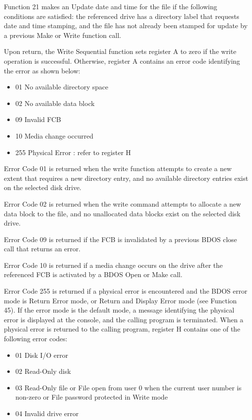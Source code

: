 Function 21 makes an Update date and time for the file if the
following conditions are satisfied: the referenced drive has a
directory label that requests date and time stamping, and the file has
not already been stamped for update by a previous Make or Write
function call.

Upon return, the Write Sequential function sets register A to zero if
the write operation is successful. Otherwise, register A contains an
error code identifying the error as shown below:

\begin{itemize}
\item 01 No available directory space
\item 02 No available data block
\item 09 Invalid FCB
\item 10 Media change occurred
\item 255 Physical Error : refer to register H
\end{itemize}

Error Code 01 is returned when the write function attempts to create a
new extent that requires a new directory entry, and no available
directory entries exist on the selected disk drive.

Error Code 02 is returned when the write command attempts to allocate
a new data block to the file, and no unallocated data blocks exist on
the selected disk drive.

Error Code 09 is returned if the FCB is invalidated by a previous BDOS
close call that returns an error.

Error Code 10 is returned if a media change occurs on the drive after
the referenced FCB is activated by a BDOS Open or Make call.

Error Code 255 is returned if a physical error is encountered and the
BDOS error mode is Return Error mode, or Return and Display Error mode
(see Function 45). If the error mode is the default mode, a message
identifying the physical error is displayed at the console, and the
calling program is terminated. When a physical error is returned to
the calling program, register H contains one of the following error
codes:

\begin{itemize}
\item 01 Disk I/O error
\item 02 Read-Only disk
\item 03 Read-Only file or File open from user 0 when the current user
  number is non-zero or File password protected in Write mode
\item 04 Invalid drive error
\end{itemize}

